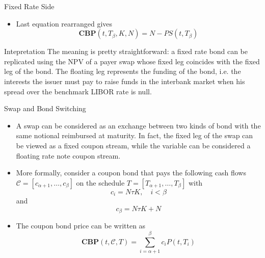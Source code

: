 \documentclass{beamer}
\begin{document}
\begin{frame}{Fixed Rate Side}
	\begin{itemize}
		\item Last equation rearranged gives
		\begin{equation}
			\textbf{CBP}(t,T_\beta,K,N) = N - PS(t,T_\beta)
		\end{equation}
	\end{itemize}
	\begin{block}{Intepretation}
		The meaning is pretty straightforward: a fixed rate bond can be replicated using the NPV of a payer swap whose fixed leg coincides with the fixed leg of the bond. The floating leg represents the funding of the bond, i.e. the interests the issuer must pay to raise funds in the interbank market when his spread over the benchmark LIBOR rate is null.
	\end{block}
\end{frame}

\begin{frame}{Swap and Bond Switching}
	\begin{itemize}
		\item A swap can be considered as an exchange between two kinds of bond with the same notional reimbursed at maturity. In fact, the fixed leg of the swap can be viewed as a fixed coupon stream, while the variable can be considered a floating rate note coupon stream. 
		\item More formally, consider a coupon bond that pays the following cash flows $\mathcal{C}=[c_{\alpha+1},\ldots,c_\beta]$	on the schedule $T = [T_{\alpha+1},\ldots,T_\beta]$ with 
		\begin{equation*}
			c_i = N\tau K,\quad i<\beta
		\end{equation*}
		and 
		\begin{equation*}
			c_\beta=N\tau K+N
		\end{equation*}
		\item The coupon bond price can be written as
		\begin{equation}
			\textbf{CBP}(t,\mathcal{C},T)=\sum_{i=\alpha+1}^{\beta}c_i P(t,T_i)
		\end{equation}
	\end{itemize}
\end{frame}
\end{document}
